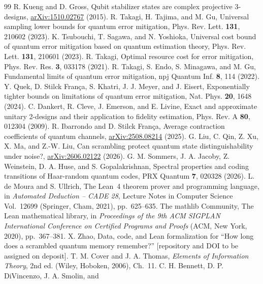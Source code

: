\documentclass[aps,prl,reprint,superscriptaddress,amsmath,amssymb]{revtex4-2}
\begin{document}
\begin{thebibliography}{99}
 R. Kueng and D. Gross, Qubit stabilizer states are
complex projective 3-designs,
\href{https://arxiv.org/abs/1510.02767}{arXiv:1510.02767} (2015).
 R. Takagi, H. Tajima, and M. Gu, Universal sampling lower
bounds for quantum error mitigation, Phys. Rev. Lett. \textbf{131}, 210602 (2023).
 K. Tsubouchi, T. Sagawa, and N. Yoshioka, Universal cost
bound of quantum error mitigation based on quantum estimation theory,
Phys. Rev. Lett. \textbf{131}, 210601 (2023).
 R. Takagi, Optimal resource cost for error mitigation,
Phys. Rev. Res. \textbf{3}, 033178 (2021).
 R. Takagi, S. Endo, S. Minagawa, and M. Gu, Fundamental
limits of quantum error mitigation, npj Quantum Inf. \textbf{8}, 114 (2022).
 Y. Quek, D. Stilck Fran\c{c}a, S. Khatri, J. J. Meyer, and
J. Eisert, Exponentially tighter bounds on limitations of quantum error
mitigation, Nat. Phys. \textbf{20}, 1648 (2024).
 C. Dankert, R. Cleve, J. Emerson, and E. Livine, Exact and
approximate unitary 2-designs and their application to fidelity estimation,
Phys. Rev. A \textbf{80}, 012304 (2009).
 R. Ibarrondo and D. Stilck Fran\c{c}a, Average contraction
coefficients of quantum channels,
\href{https://arxiv.org/abs/2508.08214}{arXiv:2508.08214} (2025).
 G. Liu, C. Qin, Z. Xu, X. Ma, and Z.-W. Liu,
Can scrambling protect quantum state distinguishability under noise?,
\href{https://arxiv.org/abs/2606.02122}{arXiv:2606.02122} (2026).
 G. M. Sommers, J. A. Jacoby, Z. Weinstein, D. A. Huse,
and S. Gopalakrishnan, Spectral properties and coding transitions of
Haar-random quantum codes, PRX Quantum \textbf{7}, 020328 (2026).
 L. de Moura and S. Ullrich, The Lean~4 theorem prover and
programming language, in \emph{Automated Deduction -- CADE 28}, Lecture Notes in
Computer Science Vol.~12699 (Springer, Cham, 2021), pp.~625--635.
 The mathlib Community, The Lean mathematical library, in
\emph{Proceedings of the 9th ACM SIGPLAN International Conference on Certified
Programs and Proofs} (ACM, New York, 2020), pp.~367--381.
 X. Zhao, Data, code, and Lean formalization for ``How long
does a scrambled quantum memory remember?'' [repository and DOI to be assigned
on deposit].
 T. M. Cover and J. A. Thomas, \emph{Elements of
Information Theory}, 2nd ed. (Wiley, Hoboken, 2006), Ch.~11.
 C. H. Bennett, D. P. DiVincenzo, J. A. Smolin, and

\end{thebibliography}
\end{document}
